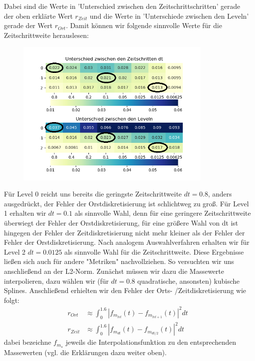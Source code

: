 Dabei sind die Werte in 'Unterschied zwischen den Zeitschrittschritten' gerade der oben erklärte Wert $r_{Zeit}$ und die Werte in  'Unterschiede zwischen den Leveln' gerade der Wert $r_{Ort}$.
Damit können wir folgende sinnvolle Werte für die Zeitschrittweite herauslesen:
\begin{figure}[H]
	\centering
	\includegraphics[width=0.85\textwidth]{../Aufgabe31/Maxdiff/Heatmapblub1.png}
\end{figure}
Für Level 0  reicht uns bereits die geringste Zeitschrittweite $dt = 0.8$, anders ausgedrückt, der Fehler der Orstdiskretisierung ist schlichtweg zu groß. Für Level 1 erhalten wir $dt= 0.1$ als sinnvolle Wahl, denn für eine geringere Zeitschrittweite überwiegt der Fehler der Orstdiskretisierung, für eine größere Wahl von dt ist hingegen der Fehler der Zeitdiskretisierung nicht mehr kleiner als der Fehler der Fehler der Orstdiskretisierung.
Nach analogem Auswahlverfahren erhalten wir für Level 2 $dt = 0.0125$ als sinnvolle Wahl für die Zeitschrittweite.
\newline
Diese Ergebnisse ließen sich auch für andere "Metriken" nachvollziehen.
So versuchten wir uns anschließend an der L2-Norm. Zunächst müssen wir dazu die Massewerte interpolieren, dazu wählen wir (für $dt = 0.8$ quadratische, ansonsten) kubische Splines. Anschließend erhielten wir den Fehler der Orts- /Zeitdiskretisierung wie folgt:
\begin{align*}
r_{Ort}  &\approx \int_0^{1.6} |f_{m_{lvl}}(t) - f_{m_{lvl + 1}}  (t) |^2 dt  \\
r_{Zeit}  &\approx \int_0^{1.6}  |f_{m_{dt}}(t) - f_{m_{dt/2} }(t) |^2 dt
\end{align*}
dabei bezeichne $f_{m_{  \star }}$ jeweils die Interpolationsfunktion zu den entsprechenden Massewerten (vgl. die Erklärungen dazu weiter oben).
